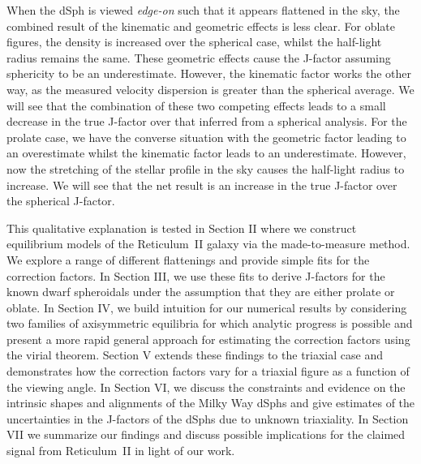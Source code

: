 \documentclass[prd,twocolumn,showpacs,preprintnumbers,superscriptaddress,nofootinbib,amsmath,amssymb,nobalancelastpage]{revtex4}
\begin{document}
When the dSph is viewed \emph{edge-on} such that it appears flattened
in the sky, the combined result of the kinematic and geometric effects
is less clear. For oblate figures, the density is increased over the
spherical case, whilst the half-light radius remains the same. These
geometric effects cause the J-factor assuming sphericity to be an
underestimate.  However, the kinematic factor works the other way, as
the measured velocity dispersion is greater than the spherical
average. We will see that the combination of these two competing
effects leads to a small decrease in the true J-factor over that
inferred from a spherical analysis. For the prolate case, we have the
converse situation with the geometric factor leading to an
overestimate whilst the kinematic factor leads to an
underestimate. However, now the stretching of the stellar profile in
the sky causes the half-light radius to increase. We will see that the
net result is an increase in the true J-factor over the spherical
J-factor.

This qualitative explanation is tested in Section II where we
construct equilibrium models of the Reticulum~II galaxy via the
made-to-measure method. We explore a range of different flattenings
and provide simple fits for the correction factors. In Section III, we
use these fits to derive J-factors for the known dwarf spheroidals under
the assumption that they are either prolate or oblate. In Section IV,
we build intuition for our numerical results by considering two
families of axisymmetric equilibria for which analytic progress is
possible and present a more rapid general approach for estimating the correction factors using the virial theorem. Section V extends these findings to the triaxial case and
demonstrates how the correction factors vary for a triaxial figure as a
function of the viewing angle. In Section VI, we discuss the
constraints and evidence on the intrinsic shapes and alignments of the
Milky Way dSphs and give estimates of the uncertainties in the J-factors of the dSphs due to unknown triaxiality. In Section VII we summarize our findings and discuss possible implications for the claimed signal from Reticulum~II in light of our work.
\end{document}
